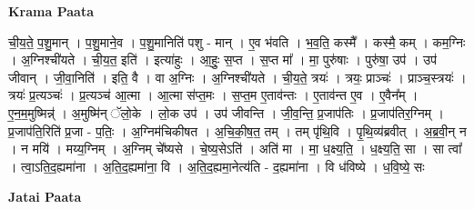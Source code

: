 \documentclass[17pt]{extarticle}
\begin{document}
\textbf{Krama Paata} \newline

ची॒य॒ते॒ प॒शु॒मान् । प॒शु॒माने॒व । प॒शु॒मानिति॑ पशु - मान् । ए॒व भ॑वति । भ॒व॒ति॒ कस्मै᳚ । कस्मै॒ कम् । कम॒ग्निः । अ॒ग्निश्ची॑यते । ची॒य॒त॒ इति॑ । इत्या॑हुः । आ॒हुः॒ स॒प्त । स॒प्त मा᳚ । मा॒ पुरु॑षाः । पुरु॑षा॒ उप॑ । उप॑ जीवान् । जी॒वा॒निति॑ । इति॒ वै । वा अ॒ग्निः । अ॒ग्निश्ची॑यते । ची॒य॒ते॒ त्रयः॑ । त्रयः॒ प्राञ्चः॑ । प्राञ्च॒स्त्रयः॑ । त्रयः॑ प्र॒त्यञ्चः॑ । प्र॒त्यञ्च॑ आ॒त्मा । आ॒त्मा स॑प्त॒मः । स॒प्त॒म ए॒ताव॑न्तः । ए॒ताव॑न्त ए॒व । ए॒वैन᳚म् । ए॒न॒म॒मुष्मिन्न्॑ । अ॒मुष्मि॑न् ॅलो॒के । लो॒क उप॑ । उप॑ जीवन्ति । जी॒व॒न्ति॒ प्र॒जाप॑तिः । प्र॒जाप॑तिर॒ग्निम् । प्र॒जाप॑ति॒रिति॑ प्र॒जा - प॒तिः॒ । अ॒ग्निम॑चिकीषत । अ॒चि॒की॒ष॒त॒ तम् । तम् पृ॑थि॒वि । पृ॒थि॒व्य॑ब्रवीत् । अ॒ब्र॒वी॒न् न । न मयि॑ । मय्य॒ग्निम् । अ॒ग्निम् चे᳚ष्यसे । चे॒ष्य॒सेऽति॑ । अति॑ मा । मा॒ ध॒क्ष्य॒ति॒ । ध॒क्ष्य॒ति॒ सा । सा त्वा᳚ । त्वा॒ऽति॒द॒ह्यमा॑ना । अ॒ति॒द॒ह्यमा॑ना॒ वि । अ॒ति॒द॒ह्यमा॒नेत्य॑ति - द॒ह्यमा॑ना । वि ध॑विष्ये । ध॒वि॒ष्ये॒ सः \newline

\textbf{Jatai Paata} \newline
\end{document}
